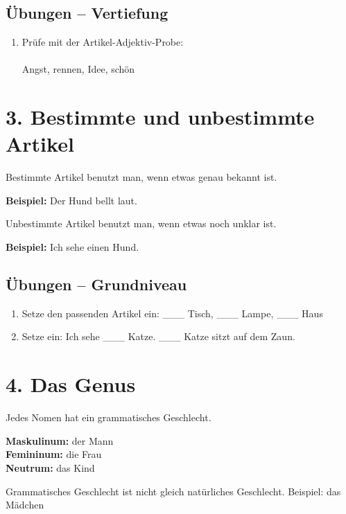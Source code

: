 \documentclass[a4paper,12pt]{article}
\begin{document}

\subsection*{Übungen – Vertiefung}

\begin{enumerate}
\item Prüfe mit der Artikel-Adjektiv-Probe:\\\\
Angst, rennen, Idee, schön
\end{enumerate}

\section*{3. Bestimmte und unbestimmte Artikel}

Bestimmte Artikel benutzt man, wenn etwas genau bekannt ist.

\textbf{Beispiel:}  
Der Hund bellt laut.

Unbestimmte Artikel benutzt man, wenn etwas noch unklar ist.

\textbf{Beispiel:}  
Ich sehe einen Hund.

\subsection*{Übungen – Grundniveau}

\begin{enumerate}
\item Setze den passenden Artikel ein: \_\_\_ Tisch, \_\_\_ Lampe, \_\_\_ Haus
\item Setze ein: Ich sehe \_\_\_ Katze. \_\_\_ Katze sitzt auf dem Zaun.
\end{enumerate}

\section*{4. Das Genus}

Jedes Nomen hat ein grammatisches Geschlecht.

\textbf{Maskulinum:} der Mann\\  
\textbf{Femininum:} die Frau\\  
\textbf{Neutrum:} das Kind  

\begin{achtung}
Grammatisches Geschlecht ist nicht gleich natürliches Geschlecht.  
Beispiel: das Mädchen
\end{achtung}
\end{document}
